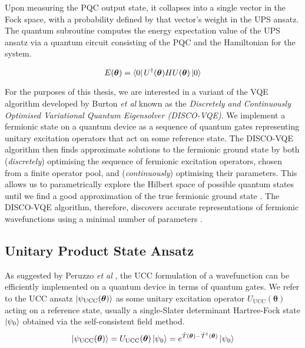 Upon measuring the PQC output state, it collapses into a single vector in the Fock space, with a probability defined by that vector's weight in the UPS ansatz. The quantum subroutine computes the energy expectation value of the UPS ansatz via a quantum circuit consisting of the PQC and the Hamiltonian for the system.

\begin{equation*}
    E(\bm\theta) = \bra{0} U^\dagger(\bm\theta) H U(\bm\theta) \ket{0} 
\end{equation*}

For the purposes of this thesis, we are interested in a variant of the VQE algorithm developed by Burton \textit{et al} \cite{Burton2023} known as the \textit{Discretely and Continuously Optimised Variational Quantum Eigensolver (DISCO-VQE)}. We implement a fermionic state on a quantum device as a sequence of quantum gates representing unitary excitation operators that act on some reference state. The DISCO-VQE algorithm then finds approximate solutions to the fermionic ground state by both (\textit{discretely}) optimising the sequence of fermionic excitation operators, chosen from a finite operator pool, and (\textit{continuously}) optimising their parameters. This allows us to parametrically explore the Hilbert space of possible quantum states until we find a good approximation of the true fermionic ground state \cite{Taube2006}. The DISCO-VQE algorithm, therefore, discovers accurate representations of fermionic wavefunctions using a minimal number of parameters \cite{Burton2023}.


\subsection{Unitary Product State Ansatz}%
\label{ups-ansatz}

As suggested by Peruzzo \textit{et al} \cite{Peruzzo2014}, the UCC formulation of a wavefunction can be efficiently implemented on a quantum device in terms of quantum gates. We refer to the UCC ansatz $\ket{\psi_{\text{UCC}}(\bm\theta)}$ as some unitary excitation operator $U_\text{UCC}(\bm\theta)$ acting on a reference state, usually a single-Slater determinant Hartree-Fock state $\ket{\psi_0}$ obtained via the self-consistent field method.
\begin{equation*}
    \ket{\psi_{\text{UCC}}(\bm\theta)} = U_\text{UCC}(\bm\theta) \ket{\psi_0} =
    e^{\hat T(\bm\theta) - \hat T^\dagger(\bm\theta)} \ket{\psi_0}
\end{equation*}

